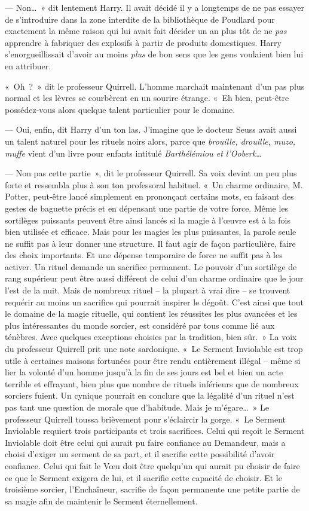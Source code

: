 --- Non…~»
dit lentement Harry.
Il avait décidé il y a longtemps de ne pas essayer de s'introduire dans la zone interdite de la bibliothèque de Poudlard pour exactement la même raison qui lui avait fait décider un an plus tôt de ne \emph{pas} apprendre à fabriquer des explosifs à partir de produits domestiques.
Harry s'enorgueillissait d'avoir au moins \emph{plus} de bon sens que les gens voulaient bien lui en attribuer.

«~Oh~?~» dit le professeur Quirrell.
L'homme marchait maintenant d'un pas plus normal et les lèvres se courbèrent en un sourire étrange.
«~Eh bien, peut-être possédez-vous alors quelque talent particulier pour le domaine.

--- Oui, enfin, dit Harry d'un ton las.
J'imagine que le docteur Seuss avait aussi un talent naturel pour les rituels noirs alors, parce que \emph{brouille, drouille, muzo, muffe} vient d'un livre pour enfants intitulé \emph{Barthélémiou et l'Ooberk}…

--- Non pas cette partie~», dit le professeur Quirrell.
Sa voix devint un peu plus forte et ressembla plus à son ton professoral habituel.
«~Un charme ordinaire, M. Potter, peut-être lancé simplement en prononçant certains mots, en faisant des gestes de baguette précis et en dépensant une partie de votre force.
Même les sortilèges puissants peuvent être ainsi lancés si la magie à l'œuvre est à la fois bien utilisée et efficace.
Mais pour les magies les plus puissantes, la parole seule ne suffit pas à leur donner une structure.
Il faut agir de façon particulière, faire des choix importants.
Et une dépense temporaire de force ne suffit pas à les activer.
Un rituel demande un sacrifice permanent.
Le pouvoir d'un sortilège de rang supérieur peut être aussi différent de celui d'un charme ordinaire que le jour l'est de la nuit.
Mais de nombreux rituel -- la plupart à vrai dire -- se trouvent requérir au moins un sacrifice qui pourrait inspirer le dégoût.
C'est ainsi que tout le domaine de la magie rituelle, qui contient les réussites les plus avancées et les plus intéressantes du monde sorcier, est considéré par tous comme lié aux ténèbres.
Avec quelques exceptions choisies par la tradition, bien sûr.~»
La voix du professeur Quirrell prit une note sardonique.
«~Le Serment Inviolable est trop utile à certaines maisons fortunées pour être rendu entièrement illégal -- même si lier la volonté d'un homme jusqu'à la fin de ses jours est bel et bien un acte terrible et effrayant, bien plus que nombre de rituels inférieurs que de nombreux sorciers fuient.
Un cynique pourrait en conclure que la légalité d'un rituel n'est pas tant une question de morale que d'habitude.
Mais je m'égare…~»
Le professeur Quirrell toussa brièvement pour s'éclaircir la gorge.
«~Le Serment Inviolable requiert trois participants et trois sacrifices.
Celui qui reçoit le Serment Inviolable doit être celui qui aurait pu faire confiance au Demandeur, mais a choisi d'exiger un serment de sa part, et il sacrifie cette possibilité d'avoir confiance.
Celui qui fait le Vœu doit être quelqu'un qui aurait pu choisir de faire ce que le Serment exigera de lui, et il sacrifie cette capacité de choisir.
Et le troisième sorcier, l'Enchaîneur, sacrifie de façon permanente une petite partie de sa magie afin de maintenir le Serment éternellement.

